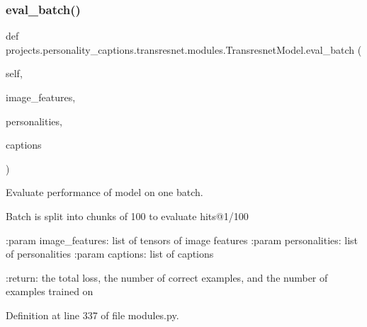 \mbox{\label{classprojects_1_1personality__captions_1_1transresnet_1_1modules_1_1TransresnetModel_a5ae5dc90e1def32a45262dc7705e07a3}} 
\subsubsection{\texorpdfstring{eval\+\_\+batch()}{eval\_batch()}}
{\footnotesize\ttfamily def projects.\+personality\+\_\+captions.\+transresnet.\+modules.\+Transresnet\+Model.\+eval\+\_\+batch (\begin{DoxyParamCaption}\item[{}]{self,  }\item[{}]{image\+\_\+features,  }\item[{}]{personalities,  }\item[{}]{captions }\end{DoxyParamCaption})}

\begin{DoxyVerb}Evaluate performance of model on one batch.

Batch is split into chunks of 100 to evaluate hits@1/100

:param image_features:
    list of tensors of image features
:param personalities:
    list of personalities
:param captions:
    list of captions

:return:
    the total loss, the number of correct examples, and the number of
    examples trained on
\end{DoxyVerb}
 

Definition at line 337 of file modules.\+py.


